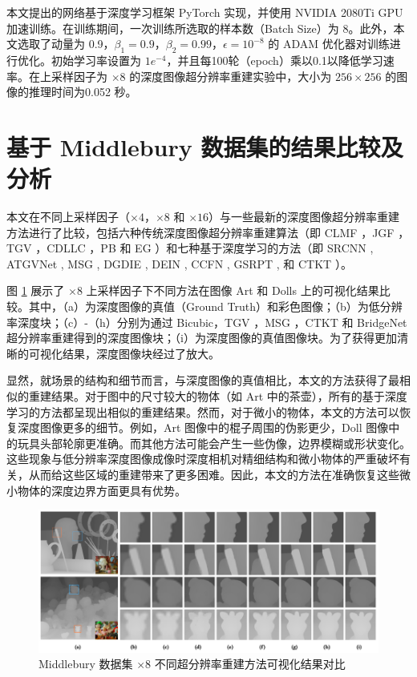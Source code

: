 本文提出的网络基于深度学习框架 PyTorch 实现，并使用 NVIDIA 2080Ti GPU 加速训练。在训练期间，一次训练所选取的样本数（Batch Size）为 8。此外，本文选取了动量为 0.9，$\beta_1=0.9$，$\beta_2=0.99$，$\epsilon={10}^{-8}$ 的 ADAM 优化器对训练进行优化。初始学习率设置为 $1e^{-4}$，并且每100轮（epoch）乘以0.1以降低学习速率。在上采样因子为 $\times 8$ 的深度图像超分辨率重建实验中，大小为 $256 \times 256$ 的图像的推理时间为0.052 秒。

\section{基于 Middlebury 数据集的结果比较及分析}

本文在不同上采样因子（$\times 4$，$\times 8$ 和 $\times 16$）与一些最新的深度图像超分辨率重建方法进行了比较，包括六种传统深度图像超分辨率重建算法（即 CLMF \cite{LuSMLD12}，JGF \cite{0001TT13}，TGV \cite{DBLP:conf/iccv/FerstlRRRB13}，CDLLC \cite{DBLP:conf/icmcs/XieCFS14}，PB \cite{DBLP:conf/eccv/AodhaCNB12} 和 EG \cite{DBLP:journals/tip/XieFS16}）和七种基于深度学习的方法（即 SRCNN \cite{DBLP:conf/eccv/DongLHT14}, ATGVNet \cite{DBLP:conf/eccv/RieglerRB16}, MSG \cite{HuiLT16}, DGDIE \cite{DBLP:conf/cvpr/GuZGCCZ17}, DEIN \cite{DBLP:conf/icassp/YeDL18}, CCFN \cite{WenSLLF19}, GSRPT \cite{LutioDWS19}, 和 CTKT \cite{Sun2021cvpr}）。

图 \ref{fig:fig4-3} 展示了 $\times 8$ 上采样因子下不同方法在图像 Art 和 Dolls 上的可视化结果比较。其中，（a）为深度图像的真值（Ground Truth）和彩色图像；（b）为低分辨率深度块；（c）-（h）分别为通过 Bicubic，TGV \cite{DBLP:conf/iccv/FerstlRRRB13}，MSG \cite{HuiLT16}，CTKT \cite{Sun2021cvpr} 和 BridgeNet 超分辨率重建得到的深度图像块；（i）为深度图像的真值图像块。为了获得更加清晰的可视化结果，深度图像块经过了放大。

\newpage
显然，就场景的结构和细节而言，与深度图像的真值相比，本文的方法获得了最相似的重建结果。对于图中的尺寸较大的物体（如 Art 中的茶壶），所有的基于深度学习的方法都呈现出相似的重建结果。然而，对于微小的物体，本文的方法可以恢复深度图像更多的细节。例如，Art 图像中的棍子周围的伪影更少，Doll 图像中的玩具头部轮廓更准确。而其他方法可能会产生一些伪像，边界模糊或形状变化。这些现象与低分辨率深度图像成像时深度相机对精细结构和微小物体的严重破坏有关，从而给这些区域的重建带来了更多困难。因此，本文的方法在准确恢复这些微小物体的深度边界方面更具有优势。

\begin{figure}[!htbp]
	\centering
	\includegraphics{figures/29.png}
	\caption{Middlebury 数据集 $\times 8$ 不同超分辨率重建方法可视化结果对比}
	\label{fig:fig4-3}
	\end{figure}
	
